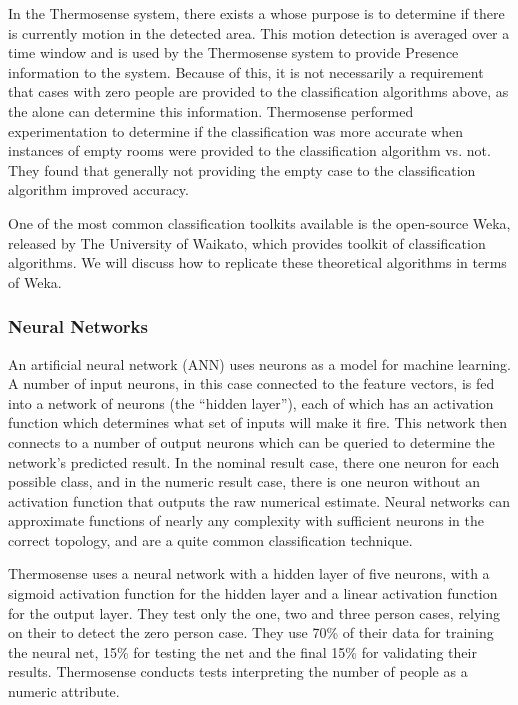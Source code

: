 \documentclass[../thesis/thesis.tex]{subfiles}
\begin{document}
In the Thermosense system, there exists a \pir whose purpose is to determine if there is currently motion in the detected area. This motion detection is averaged over a time window and is used by the Thermosense system to provide Presence information to the system. Because of this, it is not necessarily a requirement that cases with zero people are provided to the classification algorithms above, as the \pir alone can determine this information. Thermosense performed experimentation to determine if the classification was more accurate when instances of empty rooms were provided to the classification algorithm vs. not. They found that generally not providing the empty case to the classification algorithm improved accuracy.

One of the most common classification toolkits available is the open-source Weka, released by The University of Waikato, which provides toolkit of classification algorithms. We will discuss how to replicate these theoretical algorithms in terms of Weka.

\subsubsection{Neural Networks}
An artificial neural network (ANN) uses neurons as a model for machine learning. A number of input neurons, in this case connected to the feature vectors, is fed into a network of neurons (the ``hidden layer''), each of which has an activation function which determines what set of inputs will make it fire. This network then connects to a number of output neurons which can be queried to determine the network's predicted result. In the nominal result case, there one neuron for each possible class, and in the numeric result case, there is one neuron without an activation function that outputs the raw numerical estimate. Neural networks can approximate functions of nearly any complexity with sufficient neurons in the correct topology, and are a quite common classification technique.

Thermosense uses a neural network with a hidden layer of five neurons, with a sigmoid activation function for the hidden layer and a linear activation function for the output layer. They test only the one, two and three person cases, relying on their \pir to detect the zero person case. They use 70\% of their data for training the neural net, 15\% for testing the net and the final 15\% for validating their results. Thermosense conducts tests interpreting the number of people as a numeric attribute.
\end{document}
